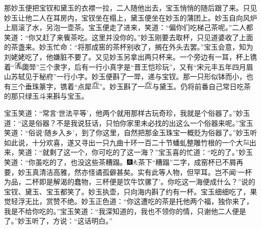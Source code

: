 那妙玉便把宝钗和黛玉的衣襟一拉，二人随他出去，宝玉悄悄的随后跟了来。只见妙玉让他二人在耳房内，宝钗坐在榻上，黛玉便坐在妙玉的蒲团上。妙玉自向风炉上扇滚了水，另泡一壶茶。宝玉便走了进来，笑道：“偏你们吃梯己茶呢。”二人都笑道：“你又赶了来飺茶吃。这里并没你的。”妙玉刚要去取杯，只见道婆收了上面的茶盏来。妙玉忙命：“将那成窑的茶杯别收了，搁在外头去罢。”宝玉会意，知为刘姥姥吃了，他嫌脏不要了。又见妙玉另拿出两只杯来。一个旁边有一耳，杯上镌着“\includegraphics[width=4mm,height=3.9mm,align=c,vshift=0.4mm]{../images/00033}瓟斝”三个隶字，后有一行小真字是“晋王恺珍玩”，又有“宋元丰五年四月眉山苏轼见于秘府”一行小字。妙玉便斟了一斝，递与宝钗。那一只形似钵而小，也有三个垂珠篆字，镌着“点犀\includegraphics[width=4mm,height=3.9mm,align=c,vshift=0.4mm]{../images/00034}”。妙玉斟了一\includegraphics[width=4mm,height=3.9mm,align=c,vshift=0.4mm]{../images/00034}与黛玉。仍将前番自己常日吃茶的那只绿玉斗来斟与宝玉。

宝玉笑道：“常言‘世法平等’，他两个就用那样古玩奇珍，我就是个俗器了。”妙玉道：“这是俗器？不是我说狂话，只怕你家里未必找的出这么一个俗器来呢。”宝玉笑道：“俗说‘随乡入乡’，到了你这里，自然把那金玉珠宝一概贬为俗器了。”妙玉听如此说，十分欢喜，遂又寻出一只九曲十环一百二十节蟠虬整雕竹根的一个大\includegraphics[width=9.4pt,height=9.4pt,align=c,vshift=1pt]{../images/00013}出来，笑道：“就剩了这一个，你可吃的了这一海？”宝玉喜的忙道：“吃的了。”妙玉笑道：“你虽吃的了，也没这些茶糟蹋。{\includegraphics[width=3mm]{../Images/00004}\includegraphics[width=3mm]{../Images/00012}\footnotesize \kaishu 茶下“糟蹋”二字，成窑杯已不屑再要，妙玉真清洁高雅，然亦怪谲孤僻甚矣。实有此等人物，但罕耳。}岂不闻‘一杯为品，二杯即是解渴的蠢物，三杯便是饮牛饮骡了’。你吃这一海便成什么？”说的宝钗、黛玉、宝玉都笑了。妙玉执壶，只向海内斟了约有一杯。宝玉细细吃了，果觉轻浮无比，赏赞不绝。妙玉正色道：“你这遭吃的茶是托他两个福，独你来了，我是不给你吃的。”宝玉笑道：“我深知道的，我也不领你的情，只谢他二人便是了。”妙玉听了，方说：“这话明白。”

